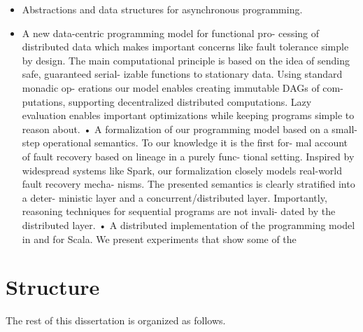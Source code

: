 \begin{itemize}

	\item Abstractions and data structures for asynchronous programming.

	\item

  
A new data-centric programming model for functional pro- cessing of distributed data which makes important concerns like fault tolerance simple by design. The main computational principle is based on the idea of sending safe, guaranteed serial- izable functions to stationary data. Using standard monadic op- erations our model enables creating immutable DAGs of com- putations, supporting decentralized distributed computations. Lazy evaluation enables important optimizations while keeping programs simple to reason about.
• A formalization of our programming model based on a small- step operational semantics. To our knowledge it is the first for- mal account of fault recovery based on lineage in a purely func- tional setting. Inspired by widespread systems like Spark, our formalization closely models real-world fault recovery mecha- nisms. The presented semantics is clearly stratified into a deter- ministic layer and a concurrent/distributed layer. Importantly, reasoning techniques for sequential programs are not invali- dated by the distributed layer.
• A distributed implementation of the programming model in and for Scala. We present experiments that show some of the

\end{itemize}

\section{Structure}

The rest of this dissertation is organized as follows.

